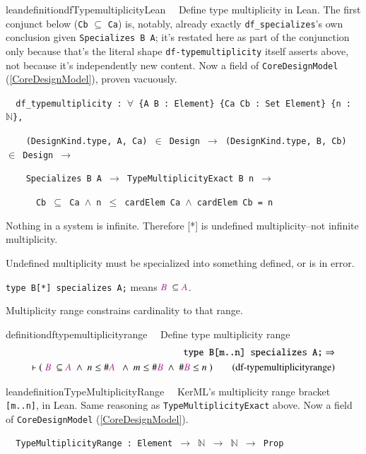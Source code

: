 \begin{restatable}{leandefinition}{dfTypemultiplicityLean}~~ Define type
multiplicity in Lean. The first conjunct below (\texttt{Cb} $\subseteq$ \texttt{Ca}) is, notably, already
exactly \texttt{df\_specializes}'s own conclusion given \texttt{Specializes B A}; it's restated here as part
of the conjunction only because that's the literal shape \texttt{df-typemultiplicity} itself asserts above,
not because it's independently new content. Now a field of \texttt{CoreDesignModel} (\ref{CoreDesignModel}),
proven vacuously.

\texttt{~~df\_typemultiplicity : $\forall$ \{A B : Element\} \{Ca Cb : Set Element\} \{n : $\mathbb{N}$\},}

\texttt{~~~~(DesignKind.type, A, Ca) $\in$ Design $\to$ (DesignKind.type, B, Cb) $\in$ Design $\to$}

\texttt{~~~~Specializes B A $\to$ TypeMultiplicityExact B n $\to$}

\texttt{~~~~~~Cb $\subseteq$ Ca $\wedge$ n $\le$ cardElem Ca $\wedge$ cardElem Cb = n}
\label{df_typemultiplicity}
\end{restatable}

\pn Nothing in a system is infinite.  Therefore [*] is undefined multiplicity--not infinite multiplicity.

\pn Undefined multiplicity must be specialized into something defined, or is in error.

\pn \texttt{type B[*] specializes A;} means $\mc{B}~\subseteq \mc{A}$.

\pn Multiplicity range constrains cardinality to that range.

\begin{restatable}{definition}{dftypemultiplicityrange}~~ Define type multiplicity range
\begin{align}
\texttt{type B[m..n] specializes A;} \Rightarrow \notag \\
\vdash (~\mc{B}~\subseteq \mc{A}~\wedge~n\le\#\mc{A}~~\wedge~m\le\#\mc{B}~\wedge~\#\mc{B}\le n~)
\label{eq:df-typemultiplicityrange}\tag{df-typemultiplicityrange}
\end{align}
\end{restatable}

\begin{restatable}{leandefinition}{TypeMultiplicityRange}~~ KerML's multiplicity
range bracket \texttt{[m..n]}, in Lean. Same reasoning as \texttt{TypeMultiplicityExact} above. Now a field
of \texttt{CoreDesignModel} (\ref{CoreDesignModel}).

\texttt{~~TypeMultiplicityRange : Element $\to$ $\mathbb{N}$ $\to$ $\mathbb{N}$ $\to$ Prop}
\label{TypeMultiplicityRange}
\end{restatable}

